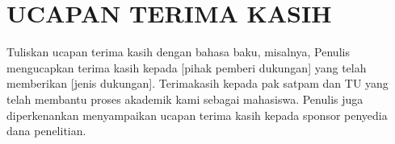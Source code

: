 \section*{UCAPAN TERIMA KASIH}

Tuliskan ucapan terima kasih dengan bahasa baku, misalnya, Penulis mengucapkan
terima kasih kepada [pihak pemberi dukungan] yang telah memberikan [jenis
dukungan]. Terimakasih kepada pak satpam dan TU yang telah membantu proses akademik kami sebagai mahasiswa. Penulis juga diperkenankan menyampaikan ucapan terima kasih kepada
sponsor penyedia dana penelitian.
